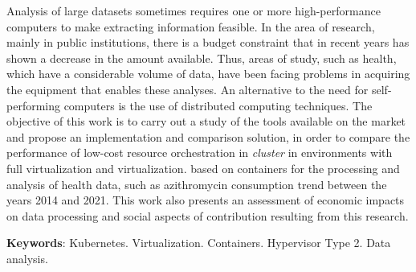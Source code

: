 
\begin{resumo}[Abstract]
    Analysis of large datasets sometimes requires one or more high-performance computers to make extracting information feasible. In the area of research, mainly in public institutions, there is a budget constraint that in recent years has shown a decrease in the amount available. Thus, areas of study, such as health, which have a considerable volume of data, have been facing problems in acquiring the equipment that enables these analyses. An alternative to the need for self-performing computers is the use of distributed computing techniques. The objective of this work is to carry out a study of the tools available on the market and propose an implementation and comparison solution, in order to compare the performance of low-cost resource orchestration in \emph{cluster} in environments with full virtualization and virtualization. based on containers for the processing and analysis of health data, such as azithromycin consumption trend between the years 2014 and 2021. This work also presents an assessment of economic impacts on data processing and social aspects of contribution resulting from this research.

    \textbf{Keywords}: Kubernetes. Virtualization. Containers. Hypervisor Type 2. Data analysis.
\end{resumo}

